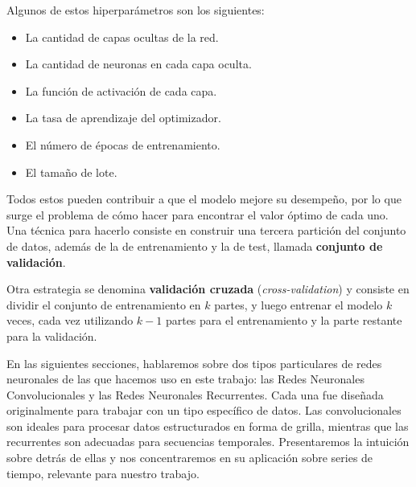 \documentclass[../../main.tex]{subfiles}
\begin{document}
Algunos de estos hiperparámetros son los siguientes:
\begin{itemize}[itemsep=0.1cm]
    \item La cantidad de capas ocultas de la red.
    \item La cantidad de neuronas en cada capa oculta.
    \item La función de activación de cada capa.
    \item La tasa de aprendizaje del optimizador.
    \item El número de épocas de entrenamiento.
    \item El tamaño de lote.
\end{itemize}

Todos estos pueden contribuir a que el modelo mejore su desempeño, por lo que surge
el problema de cómo hacer para encontrar el valor óptimo de cada uno. Una técnica para
hacerlo consiste en construir una tercera partición del conjunto de datos, además
de la de entrenamiento y la de test, llamada \textbf{conjunto de validación}.

Otra estrategia se denomina \textbf{validación cruzada} (\textit{cross-validation}) y
consiste en dividir el conjunto de entrenamiento en \(k\) partes, y luego entrenar el
modelo \(k\) veces, cada vez utilizando \(k-1\) partes para el entrenamiento y la parte
restante para la validación.

\begin{comment}
Otras mejoras que se han implementado para mejorar la eficacia de los modelos, y que
emplearemos en los experimentos, son las nombradas a continuación. Por un lado, tenemos la
\textbf{detención temprana}, que consiste en frenar el entrenamiento en el último mejor
``estado'' del modelo cuando se observa que a partir de dicho punto el error sobre el
conjunto de validación no mejora (notar que cuántas épocas se espera y qué se considera
una mejora son nuevos hiperparámetros). Y por otro lado, el \textbf{dropout}, que es un
algoritmo que implica suprimir un cierto número de neuronas de una capa de manera
aleatoria \cite{apuntes-redes-neuronales}.
\end{comment}

\bigskip
En las siguientes secciones, hablaremos sobre dos tipos particulares de redes neuronales
de las que hacemos uso en este trabajo: las Redes Neuronales Convolucionales y las Redes
Neuronales Recurrentes. Cada una fue diseñada originalmente para trabajar con un tipo
específico de datos. Las convolucionales son ideales para procesar datos estructurados en
forma de grilla, mientras que las recurrentes son adecuadas para secuencias temporales.
Presentaremos la intuición sobre detrás de ellas y nos concentraremos en su aplicación
sobre series de tiempo, relevante para nuestro trabajo.
\end{document}
